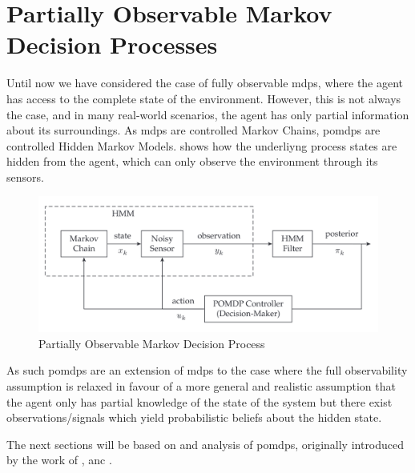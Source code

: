 
\chapter{Partially Observable Markov Decision Processes}

Until now we have considered the case of fully observable \glspl{mdp}, 
where the agent has access to the complete state of the environment. However, this is not always the case, 
and in many real-world scenarios, the agent has only partial information about its surroundings. 
As \glspl{mdp} are controlled Markov Chains, \glspl{pomdp} are controlled Hidden Markov Models. 
shows how the underliyng process states are hidden from the agent, which can only observe the environment 
through its sensors.
\begin{figure}[H]
    \centering
    \includegraphics[scale=.15]{images/pomdp.png}
    \caption[Partially Observable Markov Decision Process]{Partially Observable Markov Decision Process \citep{Krishnamurthy_2016}}
    \label{fig:pomdp}
\end{figure}
As such \glspl{pomdp} are an extension of \glspl{mdp} to the case where the full observability assumption is 
relaxed in favour of a more general and realistic assumption that the agent only has partial knowledge 
of the state of the system but there exist observations/signals which yield probabilistic beliefs about 
the hidden state.

The next sections will be based on \cite{Spaan12pomdp} and \cite{Hauskrecht_2000} analysis of \glspl{pomdp},
originally introduced by the work of \cite{drake1962observation} \cite{1307539f-051d-3d3c-a0d8-111443bed03f},
\cite{ASTROM1965174} anc \cite{10.1007/BF02055574}.


